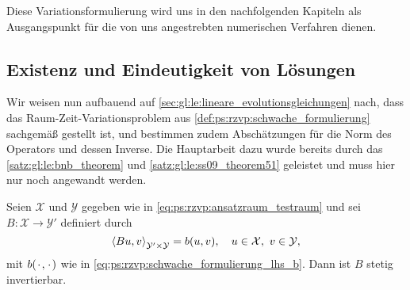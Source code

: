Diese Variationsformulierung wird uns in den nachfolgenden Kapiteln als Ausgangspunkt für die von uns angestrebten numerischen Verfahren dienen.

\subsection{Existenz und Eindeutigkeit von Lösungen} %
\label{sub:ps:eel:existenz_und_eindeutigkeit_von_loesungen}

Wir weisen nun aufbauend auf \cref{sec:gl:le:lineare_evolutionsgleichungen} nach, dass das Raum-Zeit-Variationsproblem aus \cref{def:ps:rzvp:schwache_formulierung} sachgemäß gestellt ist, und bestimmen zudem Abschätzungen für die Norm des Operators und dessen Inverse.
Die Hauptarbeit dazu wurde bereits durch das \cref{satz:gl:le:bnb_theorem} und \cref{satz:gl:le:ss09_theorem51} geleistet und muss hier nur noch angewandt werden.

\begin{Satz}
\label{satz:ps:eel:schwache_formulierung_sachgemaess_gestellt}
    Seien $\mathcal X$ und $\mathcal Y$ gegeben wie in \cref{eq:ps:rzvp:ansatzraum_testraum} und sei $B \colon \mathcal X \to \mathcal Y'$ definiert durch
    \begin{equation}
        \left\langle Bu,v\right\rangle_{\mathcal Y' \times \mathcal Y}  = b(u, v), \quad u \in \mathcal X,~ v \in \mathcal Y,
    \end{equation}
    mit $b({\mkern2mu\cdot\mkern2mu}, {\mkern2mu\cdot\mkern2mu})$ wie in \cref{eq:ps:rzvp:schwache_formulierung_lhs_b}.
    Dann ist $B$ stetig invertierbar.
\end{Satz}

